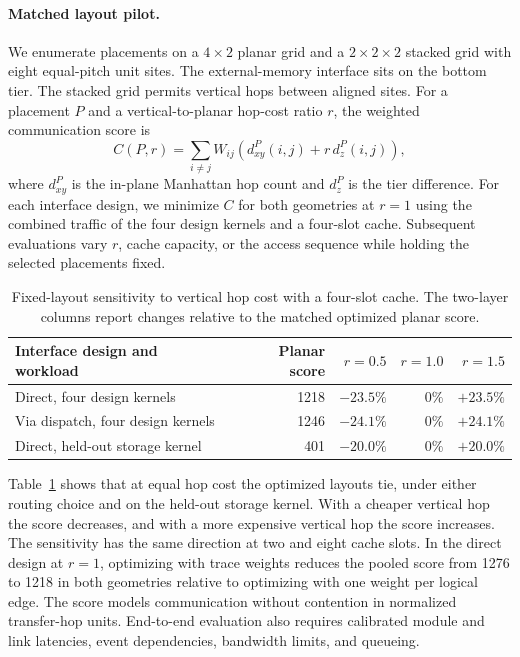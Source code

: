 \documentclass[runningheads]{llncs}
\begin{document}
\paragraph{Matched layout pilot.} We enumerate placements on a $4\times2$ planar grid and a $2\times2\times2$ stacked grid with eight equal-pitch unit sites. The external-memory interface sits on the bottom tier. The stacked grid permits vertical hops between aligned sites. For a placement $P$ and a vertical-to-planar hop-cost ratio $r$, the weighted communication score is
\begin{equation}
C(P,r)=\sum_{i\ne j}W_{ij}\left(d_{xy}^{P}(i,j)+ r\,d_z^{P}(i,j)\right),
\end{equation}
where $d_{xy}^{P}$ is the in-plane Manhattan hop count and $d_z^{P}$ is the tier difference. For each interface design, we minimize $C$ for both geometries at $r=1$ using the combined traffic of the four design kernels and a four-slot cache. Subsequent evaluations vary $r$, cache capacity, or the access sequence while holding the selected placements fixed.

\begin{table}[tb]
\caption{Fixed-layout sensitivity to vertical hop cost with a four-slot cache. The two-layer columns report changes relative to the matched optimized planar score.}\label{tab:layout-pilot}
\small\centering
\begin{tabular*}{\textwidth}{@{\extracolsep{\fill}}lrrrr@{}}
\toprule
Interface design and workload & Planar score & $r=0.5$ & $r=1.0$ & $r=1.5$\\
\midrule
Direct, four design kernels & 1218 & $-23.5\%$ & $0\%$ & $+23.5\%$\\
Via dispatch, four design kernels & 1246 & $-24.1\%$ & $0\%$ & $+24.1\%$\\
Direct, held-out storage kernel & 401 & $-20.0\%$ & $0\%$ & $+20.0\%$\\
\bottomrule
\end{tabular*}
\end{table}

Table~\ref{tab:layout-pilot} shows that at equal hop cost the optimized layouts tie, under either routing choice and on the held-out storage kernel. With a cheaper vertical hop the score decreases, and with a more expensive vertical hop the score increases. The sensitivity has the same direction at two and eight cache slots. In the direct design at $r=1$, optimizing with trace weights reduces the pooled score from 1276 to 1218 in both geometries relative to optimizing with one weight per logical edge. The score models communication without contention in normalized transfer-hop units. End-to-end evaluation also requires calibrated module and link latencies, event dependencies, bandwidth limits, and queueing.
\end{document}
